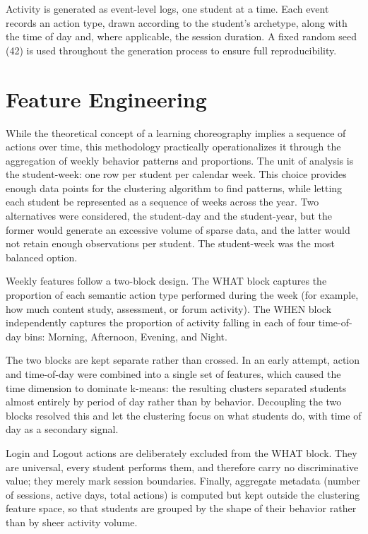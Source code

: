 Activity is generated as event-level logs, one student at a time. Each event records an action type, drawn according to the student's archetype, along with the time of day and, where applicable, the session duration. A fixed random seed (42) is used throughout the generation process to ensure full reproducibility.

\section{Feature Engineering}
\label{sec:feature-engineering}
While the theoretical concept of a learning choreography implies a sequence of actions over time, this methodology practically operationalizes it through the aggregation of weekly behavior patterns and proportions. The unit of analysis is the student-week: one row per student per calendar week. This choice provides enough data points for the clustering algorithm to find patterns, while letting each student be represented as a sequence of weeks across the year. Two alternatives were considered, the student-day and the student-year, but the former would generate an excessive volume of sparse data, and the latter would not retain enough observations per student. The student-week was the most balanced option.

Weekly features follow a two-block design. The WHAT block captures the proportion of each semantic action type performed during the week (for example, how much content study, assessment, or forum activity). The WHEN block independently captures the proportion of activity falling in each of four time-of-day bins: Morning, Afternoon, Evening, and Night.

The two blocks are kept separate rather than crossed. In an early attempt, action and time-of-day were combined into a single set of features, which caused the time dimension to dominate k-means: the resulting clusters separated students almost entirely by period of day rather than by behavior. Decoupling the two blocks resolved this and let the clustering focus on what students do, with time of day as a secondary signal.

Login and Logout actions are deliberately excluded from the WHAT block. They are universal, every student performs them, and therefore carry no discriminative value; they merely mark session boundaries. Finally, aggregate metadata (number of sessions, active days, total actions) is computed but kept outside the clustering feature space, so that students are grouped by the shape of their behavior rather than by sheer activity volume.

